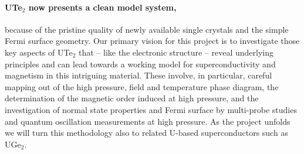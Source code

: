 \paragraph{UTe$_2$ now presents a clean model system,} because of the pristine quality of newly available single crystals and the simple Fermi surface geometry. Our primary vision for this project is to investigate those key aspects of UTe$_2$ that -- like the electronic structure --  reveal underlying principles and can lead towards a working model for superconductivity and magnetism in this intriguing material. These involve, in particular, careful mapping out of the high pressure, field and temperature phase diagram, the determination of the magnetic order induced at high pressure, and the investigation of normal state properties and Fermi surface by multi-probe studies and quantum oscillation measurements at high pressure. As the project unfolds we will turn this methodology also to related U-based superconductors such as UGe$_2$. 





